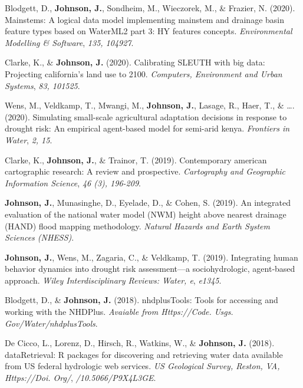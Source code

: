 \documentclass[11pt,a4paper,]{awesome-cv}
\begin{document}
\leavevmode{}%
Blodgett, D., \textbf{Johnson, J.}, Sondheim, M., Wieczorek, M., \&
Frazier, N. (2020). Mainstems: A logical data model implementing
mainstem and drainage basin feature types based on WaterML2 part 3: HY
features concepts. \emph{Environmental Modelling \& Software},
\emph{135, 104927}.

\leavevmode{}%
Clarke, K., \& \textbf{Johnson, J.} (2020). Calibrating SLEUTH with big
data: Projecting california's land use to 2100. \emph{Computers,
Environment and Urban Systems}, \emph{83, 101525}.

\leavevmode{}%
Wens, M., Veldkamp, T., Mwangi, M., \textbf{Johnson, J.}, Lasage, R.,
Haer, T., \& \ldots. (2020). Simulating small-scale agricultural
adaptation decisions in response to drought risk: An empirical
agent-based model for semi-arid kenya. \emph{Frontiers in Water},
\emph{2, 15}.

\leavevmode{}%
Clarke, K., \textbf{Johnson, J.}, \& Trainor, T. (2019). Contemporary
american cartographic research: A review and prospective.
\emph{Cartography and Geographic Information Science}, \emph{46 (3),
196-209}.

\leavevmode{}%
\textbf{Johnson, J.}, Munasinghe, D., Eyelade, D., \& Cohen, S. (2019).
An integrated evaluation of the national water model (NWM) height above
nearest drainage (HAND) flood mapping methodology. \emph{Natural Hazards
and Earth System Sciences (NHESS)}.

\leavevmode{}%
\textbf{Johnson, J.}, Wens, M., Zagaria, C., \& Veldkamp, T. (2019).
Integrating human behavior dynamics into drought risk assessment---a
sociohydrologic, agent‐based approach. \emph{Wiley Interdisciplinary
Reviews: Water, e}, \emph{e1345}.

\leavevmode{}%
Blodgett, D., \& \textbf{Johnson, J.} (2018). nhdplusTools: Tools for
accessing and working with the NHDPlus. \emph{Avaiable from
Https://Code. Usgs. Gov/Water/nhdplusTools}.

\leavevmode{}%
De Cicco, L., Lorenz, D., Hirsch, R., Watkins, W., \&
\textbf{Johnson, J.} (2018). dataRetrieval: R packages for discovering
and retrieving water data available from US federal hydrologic web
services. \emph{US Geological Survey, Reston, VA, Https://Doi. Org/},
\emph{/10.5066/P9X4L3GE}.
\end{document}
